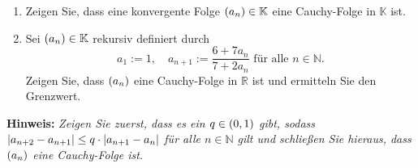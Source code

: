 \documentclass[german,12pt]{homework}
\newcommand{\NN}{\mathbb{N}}
\newcommand{\RR}{\mathbb{R}}
\newcommand{\KK}{\mathbb{K}}
\DeclarePairedDelimiter{\absolute}{\lvert}{\rvert}
\DeclarePairedDelimiter{\enbrace}{(}{)}
\begin{document}
    \begin{problem}
        \begin{enumerate}
            \item Zeigen Sie, dass eine konvergente Folge \(\enbrace*{a_n} \in
            \KK\) eine Cauchy-Folge in \(\KK\) ist.
            \item Sei \(\enbrace*{a_n} \in \KK\) rekursiv definiert durch
            \[a_1 := 1, \quad a_{n + 1} := \frac{6 + 7a_n}{7 + 2a_n}\text{ für
            alle }n \in \NN.\]
            Zeigen Sie, dass \(\enbrace*{a_n}\) eine Cauchy-Folge in \(\RR\)
            ist und ermitteln Sie den Grenzwert.
        \end{enumerate}
        \textbf{Hinweis:} \quad \emph{Zeigen Sie zuerst, dass es ein \(q \in
        \enbrace*{0, 1}\) gibt, sodass \(\absolute*{a_{n + 2} - a_{n + 1}} \le
        q \cdot \absolute*{a_{n + 1} - a_n}\) für alle \(n \in \NN\) gilt und
        schließen Sie hieraus, dass \(\enbrace*{a_n}\) eine Cauchy-Folge ist.}
    \end{problem}
\end{document}
